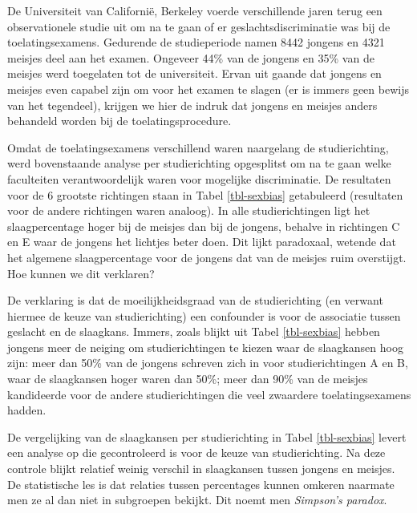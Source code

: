 \documentclass[
  dutch,
  letterpaper,
  12pt]{book}
\theoremstyle{definition}
\theoremstyle{definition}
\theoremstyle{definition}
\theoremstyle{remark}
\begin{document}
De Universiteit van Californië, Berkeley voerde verschillende jaren
terug een observationele studie uit om na te gaan of er
geslachtsdiscriminatie was bij de toelatingsexamens. Gedurende de
studieperiode namen 8442 jongens en 4321 meisjes deel aan het examen.
Ongeveer 44\% van de jongens en 35\% van de meisjes werd toegelaten tot
de universiteit. Ervan uit gaande dat jongens en meisjes even capabel
zijn om voor het examen te slagen (er is immers geen bewijs van het
tegendeel), krijgen we hier de indruk dat jongens en meisjes anders
behandeld worden bij de toelatingsprocedure.

Omdat de toelatingsexamens verschillend waren naargelang de
studierichting, werd bovenstaande analyse per studierichting opgesplitst
om na te gaan welke faculteiten verantwoordelijk waren voor mogelijke
discriminatie. De resultaten voor de 6 grootste richtingen staan in
Tabel \ref{tbl-sexbias} getabuleerd (resultaten voor de andere
richtingen waren analoog). In alle studierichtingen ligt het
slaagpercentage hoger bij de meisjes dan bij de jongens, behalve in
richtingen C en E waar de jongens het lichtjes beter doen. Dit lijkt
paradoxaal, wetende dat het algemene slaagpercentage voor de jongens dat
van de meisjes ruim overstijgt. Hoe kunnen we dit verklaren?

De verklaring is dat de moeilijkheidsgraad van de studierichting (en
verwant hiermee de keuze van studierichting) een confounder is voor de
associatie tussen geslacht en de slaagkans. Immers, zoals blijkt uit
Tabel \ref{tbl-sexbias} hebben jongens meer de neiging om
studierichtingen te kiezen waar de slaagkansen hoog zijn: meer dan 50\%
van de jongens schreven zich in voor studierichtingen A en B, waar de
slaagkansen hoger waren dan 50\%; meer dan 90\% van de meisjes
kandideerde voor de andere studierichtingen die veel zwaardere
toelatingsexamens hadden.

De vergelijking van de slaagkansen per studierichting in Tabel
\ref{tbl-sexbias} levert een analyse op die gecontroleerd is voor de
keuze van studierichting. Na deze controle blijkt relatief weinig
verschil in slaagkansen tussen jongens en meisjes. De statistische les
is dat relaties tussen percentages kunnen omkeren naarmate men ze al dan
niet in subgroepen bekijkt. Dit noemt men \emph{Simpson's paradox}.
\end{document}
